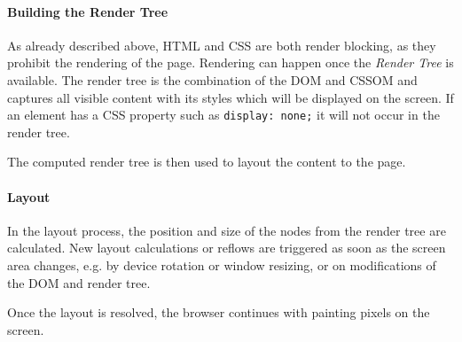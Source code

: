 










\paragraph{Building the Render Tree}


As already described above, HTML and CSS are both render blocking, as they prohibit the rendering of the page.
Rendering can happen once the \textit{Render Tree} is available.
The render tree is the combination of the DOM and CSSOM and captures all visible content with its styles which will be displayed on the screen.
If an element has a CSS property such as \verb|display: none;| it will not occur in the render tree. %

The computed render tree is then used to layout the content to the page.








\paragraph{Layout}


In the layout process, the position and size of the nodes from the render tree are calculated.
New layout calculations or reflows are triggered as soon as the screen area changes, e.g. by device rotation or window resizing, or on modifications of the DOM and render tree. %

Once the layout is resolved, the browser continues with painting pixels on the screen.


